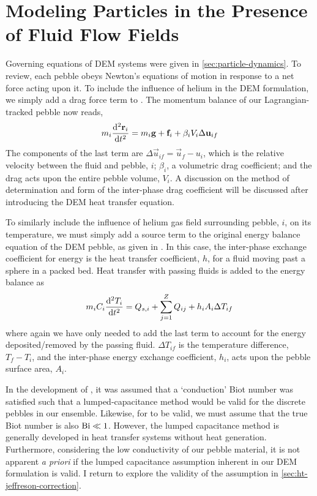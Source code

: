 \section{Modeling Particles in the Presence of Fluid Flow Fields} \label{sec:modeling-cfd-dem}
Governing equations of DEM systems were given in \cref{sec:particle-dynamics}. To review, each pebble obeys Newton's equations of motion in response to a net force acting upon it. To include the influence of helium in the DEM formulation, we simply add a drag force term to . The momentum balance of our Lagrangian-tracked pebble now reads,
\begin{equation}\label{eq:cfdem-dem-momentum}
	m_i  \frac{\mathrm{d}^2{\mathbf{r}_i}}{\mathrm{d}t^2} = m_i\mathbf{g} + \mathbf{f}_i + \beta_i V_i \Delta \mathbf{u}_{if}
\end{equation}
The components of the last term are $\Delta \vec{u}_{if} = \vec{u}_f - u_i$, which is the relative velocity between the fluid and pebble, $i$; $\beta_i$, a volumetric drag coefficient; and the drag acts upon the entire pebble volume, $V_i$. A discussion on the method of determination and form of the inter-phase drag coefficient will be discussed after introducing the DEM heat transfer equation.

To similarly include the influence of helium gas field surrounding pebble, $i$, on its temperature, we must simply add a source term to the original energy balance equation of the DEM pebble, as given in . In this case, the inter-phase exchange coefficient for energy is the heat transfer coefficient, $h$, for a fluid moving past a sphere in a packed bed. Heat transfer with passing fluids is added to the energy balance as
\begin{equation}\label{eq:cfdem-dem-energy}
	m_iC_i \frac{\mathrm{d}^2{T_i}}{\mathrm{d}t^2} = Q_{s,i} + \sum_{j=1}^Z Q_{ij} + h_i A_i \Delta T_{if}
\end{equation}
where again we have only needed to add the last term to account for the energy deposited/removed by the passing fluid. $\Delta T_{if}$ is the temperature difference, $T_f - T_i$, and the inter-phase energy exchange coefficient, $h_i$, acts upon the pebble surface area, $A_i$.

In the development of , it was assumed that a `conduction' Biot number was satisfied such that a lumped-capacitance method would be valid for the discrete pebbles in our ensemble. Likewise, for  to be valid, we must assume that the true Biot number is also $\mathrm{Bi} \ll 1$. However, the lumped capacitance method is generally developed in heat transfer systems without heat generation. Furthermore, considering the low conductivity of our pebble material, it is not apparent \textit{a priori} if the lumped capacitance assumption inherent in our DEM formulation is valid. I return to explore the validity of the assumption in \cref{sec:ht-jeffreson-correction}.

